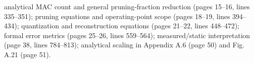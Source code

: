 {} analytical MAC count and general pruning-fraction reduction (pages 15--16, lines 335--351); pruning equations and operating-point scope (pages 18--19, lines 394--434); quantization and reconstruction equations (pages 21--22, lines 448--472); formal error metrics (pages 25--26, lines 559--564); measured/static interpretation (page 38, lines 784--813); analytical scaling in Appendix A.6 (page 50) and Fig. A.21 (page 51).
\markdownRendererSectionEnd 
\markdownRendererSectionEnd \markdownRendererDocumentEnd